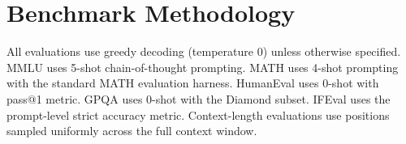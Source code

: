 \documentclass[11pt,a4paper]{article}
\begin{document}
\section{Benchmark Methodology}

All evaluations use greedy decoding (temperature 0) unless otherwise specified. MMLU uses
5-shot chain-of-thought prompting. MATH uses 4-shot prompting with the standard MATH
evaluation harness. HumanEval uses 0-shot with pass@1 metric. GPQA uses 0-shot with
the Diamond subset. IFEval uses the prompt-level strict accuracy metric. Context-length
evaluations use positions sampled uniformly across the full context window.
\end{document}
